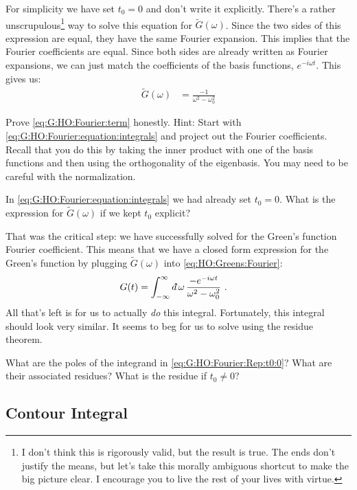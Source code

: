 For simplicity we have set $t_0=0$ and don't write it explicitly. There's a rather unscrupulous\footnote{I don't think this is rigorously valid, but the result is true. The ends don't justify the means, but let's take this morally ambiguous shortcut to make the big picture clear. I encourage you to live the rest of your lives with virtue.} way to solve this equation for $\tilde G(\omega)$. Since the two sides of this expression are equal, they have the same Fourier expansion. This implies that the Fourier coefficients are equal. Since both sides are already written as Fourier expansions, we can just match the coefficients of the basis functions, $e^{-i\omega t}$. This gives us:
\begin{align}
	\tilde G(\omega) &= \frac{-1}{\omega^2-\omega_0^2}
	\label{eq:G:HO:Fourier:term}
\end{align}
\begin{exercise}
Prove \eqref{eq:G:HO:Fourier:term} honestly. {Hint}: Start with \eqref{eq:G:HO:Fourier:equation:integrals} and project out the Fourier coefficients. Recall that you do this by taking the inner product with one of the basis functions and then using the orthogonality of the eigenbasis. You may need to be careful with the normalization.
\end{exercise}
\begin{exercise}
In \eqref{eq:G:HO:Fourier:equation:integrals} we had already set $t_0 = 0$. What is the expression for $\tilde G(\omega)$ if we kept $t_0$ explicit?
\label{eq:ex:Gtilde:with:t0:explicit}
\end{exercise}
That was the critical step: we have successfully solved for the Green's function Fourier coefficient. This means that we have a closed form expression for the Green's function by plugging $\tilde G(\omega)$ into \eqref{eq:HO:Greens:Fourier}:
\begin{align}
	G(t) &=  \int_{-\infty}^\infty \dbar \omega
	\, 
	\frac{-e^{-i\omega t}}{\omega^2-\omega_0^2} \ .
	\label{eq:G:HO:Fourier:Rep:t0:0}
\end{align}
All that's left is for us to actually \emph{do} this integral. Fortunately, this integral should look very similar. It seems to beg for us to solve using the residue theorem. 
\begin{exercise}
What are the poles of the integrand in \eqref{eq:G:HO:Fourier:Rep:t0:0}? What are their associated residues? What is the residue if $t_0\neq 0$?
\end{exercise}

\subsection{Contour Integral}


